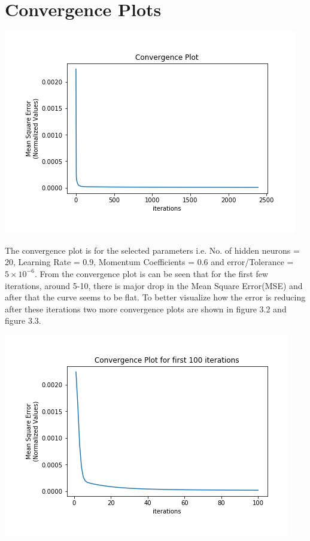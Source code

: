 \section{Convergence Plots}
\begin{center}
	\includegraphics{images/Convergence/Convergence_Plot.png}
\end{center}
The convergence plot is for the selected parameters i.e. No. of hidden neurons = 20, Learning Rate = 0.9, Momentum Coefficients = 0.6 and error/Tolerance = $5\times10^{-6}$. From the convergence plot is can be seen that for the first few iterations, around 5-10, there is major drop in the Mean Square Error(MSE) and after that the curve seems to be flat. To better visualize how the error is reducing after these iterations two more convergence plots are shown in figure 3.2 and figure 3.3.\\
\begin{center}
	\includegraphics[scale=0.8]{images/Convergence/Convergence_Plot1.png}
\end{center}
